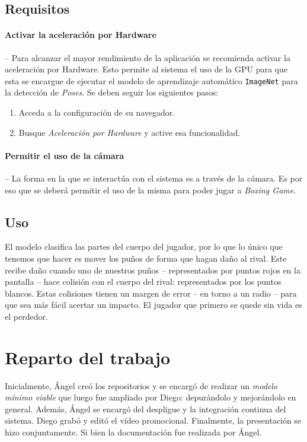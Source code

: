 \documentclass{article}
\begin{document}
\subsection{Requisitos}

\paragraph{Activar la aceleración por Hardware} \mbox{} -- Para alcanzar el mayor rendimiento de la aplicación se recomienda activar la aceleración por Hardware. Esto permite al sistema el uso de la GPU para que esta se encargue de ejecutar el modelo de aprendizaje automático \texttt{ImageNet} para la detección de \textit{Poses}. Se deben seguir los siguientes pasos:

\begin{enumerate}
    \item Acceda a la configuración de su navegador.
    \item Busque \textit{Aceleración por Hardware} y active esa funcionalidad.
\end{enumerate}

\paragraph{Permitir el uso de la cámara} \mbox{} -- La forma en la que se interactúa con el sistema es a través de la cámara. Es por eso que se deberá permitir el uso de la misma para poder jugar a \textit{Boxing Game}.

\subsection{Uso}
El modelo clasifica las partes del cuerpo del jugador, por lo que lo único que tenemos que hacer es mover los puños de forma que hagan daño al rival. Este recibe daño cuando uno de nuestros puños -- representados por puntos rojos en la pantalla -- hace colisión con el cuerpo del rival: representados por los puntos blancos. Estas colisiones tienen un margen de error -- en torno a un radio -- para que sea más fácil acertar un impacto. El jugador que primero se quede sin vida es el perdedor.

\section{Reparto del trabajo}
\label{section:work}
Inicialmente, Ángel creó los repositorios y se encargó de realizar un \textit{modelo mínimo viable} que luego fue ampliado por Diego: depurándolo y mejorándolo en general. Además, Ángel se encargó del despligue y la integración continua del sistema. Diego grabó y editó el vídeo promocional. Finalmente, la presentación se hizo conjuntamente. Si bien la documentación fue realizada por Ángel.
\end{document}
